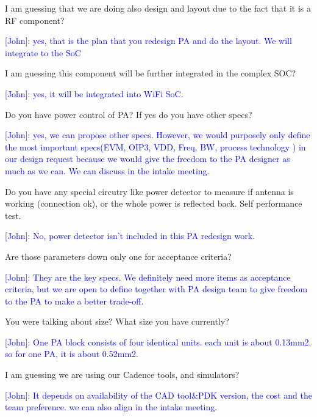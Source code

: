 \documentclass{article}
\begin{document}
I am guessing that we are doing also design and layout due to the fact that it is a RF component?

\textcolor{blue}{[John]:  yes, that is the plan that  you redesign PA and do the layout. We will integrate to the SoC }

I am guessing this component will be further integrated in the complex SOC? 

\textcolor{blue}{[John]: yes, it will be integrated into WiFi SoC. }

Do you have power control of PA?  If yes do you have other specs? 

\textcolor{blue}{[John]: yes, we can propose other specs. However, we would purposely only define the most important specs(EVM, OIP3, VDD, Freq, BW, process technology ) in our design request because we would give the freedom to the PA designer as much as we can. We can discuss  in the intake meeting. }

Do you have any special circutry like power detector to measure if antenna is working (connection ok), or the whole power is reflected back. Self performance test.

\textcolor{blue}{[John]: No, power detector isn't included in this PA redesign work.  } 

Are those parameters down only one for acceptance criteria?

\textcolor{blue}{[John]: They are the key specs. We definitely need more items as acceptance criteria, but we are open to define together with PA design team to give freedom to the PA to make a better trade-off.  }

You were talking about size? What size you have currently?

\textcolor{blue}{[John]: One PA block consists of four identical units. each unit is about 0.13mm2. so for one PA, it is about 0.52mm2.   }

I am guessing we are using our Cadence tools, and simulators?

\textcolor{blue}{[John]: It depends on availability of the CAD tool\&PDK version, the cost and the team preference. we can also align in the intake meeting.} 

\end{document}
